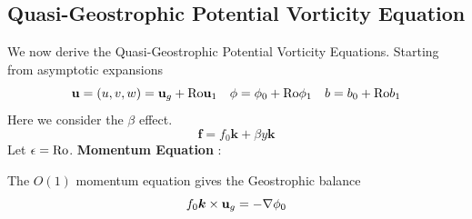 \documentclass[../SQG_notes.tex]{subfiles}
\begin{document}
    \subsection{Quasi-Geostrophic Potential Vorticity Equation}
    We now derive the Quasi-Geostrophic Potential Vorticity Equations. Starting from asymptotic expansions 
    \[ \mathbf{u} = (u, v, w) = \mathbf{u}_g + \text{Ro} \mathbf{u}_1 \quad \phi = \phi_0 + \text{Ro} \phi_1 \quad b = b_0 + \text{Ro} b_1\]
    Here we consider the $\beta$ effect. 
    \[ \mathbf{f} = f_0 \bm{k} + \beta y \bm{k}\]
    Let $\epsilon = \text{Ro}$.
    \textbf{Momentum Equation} : \par
    The $O(1)$ momentum equation gives the Geostrophic balance
    \begin{equation}
        f_0 \bm{k} \times \mathbf{u}_g = -\nabla \phi_0 \label{Geostrophic balance equation}
    \end{equation}
    
\end{document}
